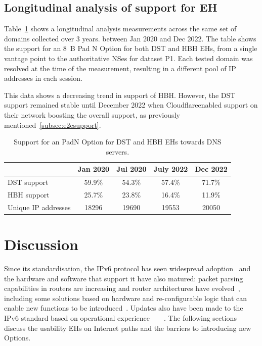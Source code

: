 \documentclass[conference]{IEEEtran}
\begin{document}
\subsection{Longitudinal analysis of support for EH}

Table~\ref{tbl:longitudinal_support} shows a longitudinal analysis measurements
across the same set of domains collected over 3 years.  between Jan 2020 and
Dec 2022.  The table shows the support for an 8~B Pad N Option for both DST and
HBH EHs, from a single vantage point to the authoritative NSes for dataset P1.
Each tested domain was resolved at the time of the measurement, resulting in a
different pool of IP addresses in each session. 

This data shows a decreasing trend in support of HBH. However, the DST support
remained stable until December 2022 when Cloudflare\texttrademark enabled support on
their network boosting the overall support, as previously
mentioned~\ref{subsec:e2esupport}.

\begin{table}
\caption{Support for an PadN Option for DST and HBH EHs towards DNS servers.}
\begin{tabular}{l|c|c|c|c}
              & Jan 2020 & Jul 2020 & July 2022 & Dec 2022 \\
\hline \hline
DST support   & 59.9\%   & 54.3\%   & 57.4\%    & 71.7\%   \\
HBH support   & 25.7\%   & 23.8\%   & 16.4\%    & 11.9\%   \\
\hline
Unique IP addresses & 18296    & 19690    & 19553     & 20050   
\end{tabular}
\label{tbl:longitudinal_support}
\end{table}


\section{Discussion} 
\label{sec:discussion}

Since its standardisation, the IPv6 protocol has
seen widespread adoption~\cite{v6adoption_ton} and the hardware and software that
support it have also matured: packet parsing capabilities in routers are increasing and
router architectures have evolved~\cite{metamorphosis, hauser2023}, including some solutions based on hardware and re-configurable
logic that can enable new functions to be introduced~\cite{cisco-silicon-one}. Updates also have been made to the IPv6 standard based on operational experience~\cite{RFC5722}~\cite{RFC6946}~\cite{RFC6564}~\cite{RFC8200}.
The following sections discuss the usability EHs on Internet paths and the barriers to introducing new Options.
\end{document}
